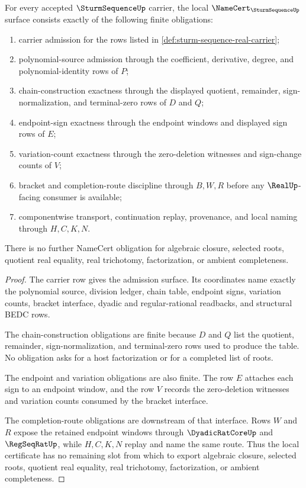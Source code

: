 \begin{theorem}
\label{thm:sturm-sequence-namecert-obligation-surface}
For every accepted $\SturmSequenceUp$ carrier, the local $\NameCert_{\SturmSequenceUp}$ surface consists exactly of the following finite obligations:
\begin{enumerate}
\item carrier admission for the rows listed in \autoref{def:sturm-sequence-real-carrier};
\item polynomial-source admission through the coefficient, derivative, degree, and polynomial-identity rows of $P$;
\item chain-construction exactness through the displayed quotient, remainder, sign-normalization, and terminal-zero rows of $D$ and $Q$;
\item endpoint-sign exactness through the endpoint windows and displayed sign rows of $E$;
\item variation-count exactness through the zero-deletion witnesses and sign-change counts of $V$;
\item bracket and completion-route discipline through $B,W,R$ before any $\RealUp$-facing consumer is available;
\item componentwise transport, continuation replay, provenance, and local naming through $H,C,K,N$.
\end{enumerate}
There is no further NameCert obligation for algebraic closure, selected roots, quotient real equality, real trichotomy, factorization, or ambient completeness.
\end{theorem}
\begin{proof}
The carrier row gives the admission surface. Its coordinates name exactly the polynomial source, division ledger, chain table, endpoint signs, variation counts, bracket interface, dyadic and regular-rational readbacks, and structural BEDC rows.

The chain-construction obligations are finite because $D$ and $Q$ list the quotient, remainder, sign-normalization, and terminal-zero rows used to produce the table. No obligation asks for a host factorization or for a completed list of roots.

The endpoint and variation obligations are also finite. The row $E$ attaches each sign to an endpoint window, and the row $V$ records the zero-deletion witnesses and variation counts consumed by the bracket interface.

The completion-route obligations are downstream of that interface. Rows $W$ and $R$ expose the retained endpoint windows through $\DyadicRatCoreUp$ and $\RegSeqRatUp$, while $H,C,K,N$ replay and name the same route. Thus the local certificate has no remaining slot from which to export algebraic closure, selected roots, quotient real equality, real trichotomy, factorization, or ambient completeness.
\end{proof}


